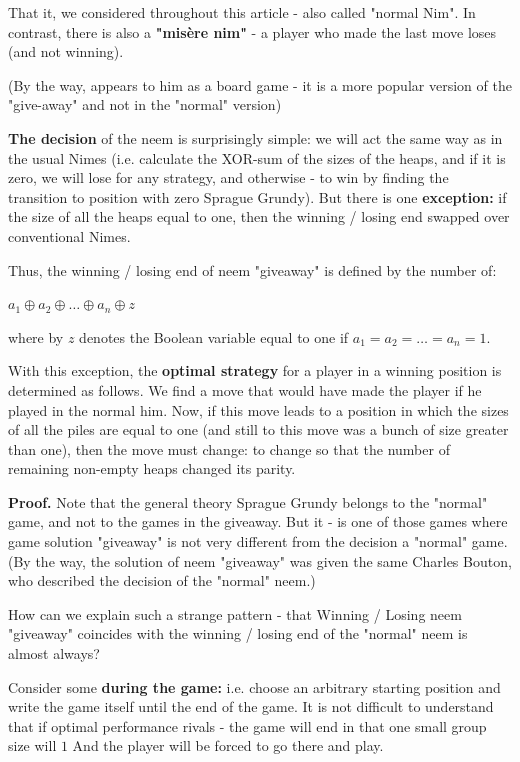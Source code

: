 That it, we considered throughout this article - also called "normal Nim". In contrast, there is also a \textbf{"misère nim"} - a player who made ​​the last move loses (and not winning).

(By the way, appears to him as a board game - it is a more popular version of the "give-away" and not in the "normal" version)

\textbf{The decision} of the neem is surprisingly simple: we will act the same way as in the usual Nimes (i.e. calculate the XOR-sum of the sizes of the heaps, and if it is zero, we will lose for any strategy, and otherwise - to win by finding the transition to position with zero Sprague Grundy). But there is one \textbf{exception:} if the size of all the heaps equal to one, then the winning / losing end swapped over conventional Nimes.

Thus, the winning / losing end of neem "giveaway" is defined by the number of:

$a_{1}\oplus a_{2}\oplus\ldots\oplus a_{n}\oplus z$

where by $z$ denotes the Boolean variable equal to one if $a_1 = a_2 = \ldots = a_n = 1$.

With this exception, the \textbf{optimal strategy} for a player in a winning position is determined as follows. We find a move that would have made the player if he played in the normal him. Now, if this move leads to a position in which the sizes of all the piles are equal to one (and still to this move was a bunch of size greater than one), then the move must change: to change so that the number of remaining non-empty heaps changed its parity.

\textbf{Proof.} Note that the general theory Sprague Grundy belongs to the "normal" game, and not to the games in the giveaway. But it - is one of those games where game solution "giveaway" is not very different from the decision a "normal" game. (By the way, the solution of neem "giveaway" was given the same Charles Bouton, who described the decision of the "normal" neem.)

How can we explain such a strange pattern - that Winning / Losing neem "giveaway" coincides with the winning / losing end of the "normal" neem is almost always?

Consider some \textbf{during the game:} i.e. choose an arbitrary starting position and write the game itself until the end of the game. It is not difficult to understand that if optimal performance rivals - the game will end in that one small group size will $1$ And the player will be forced to go there and play.

